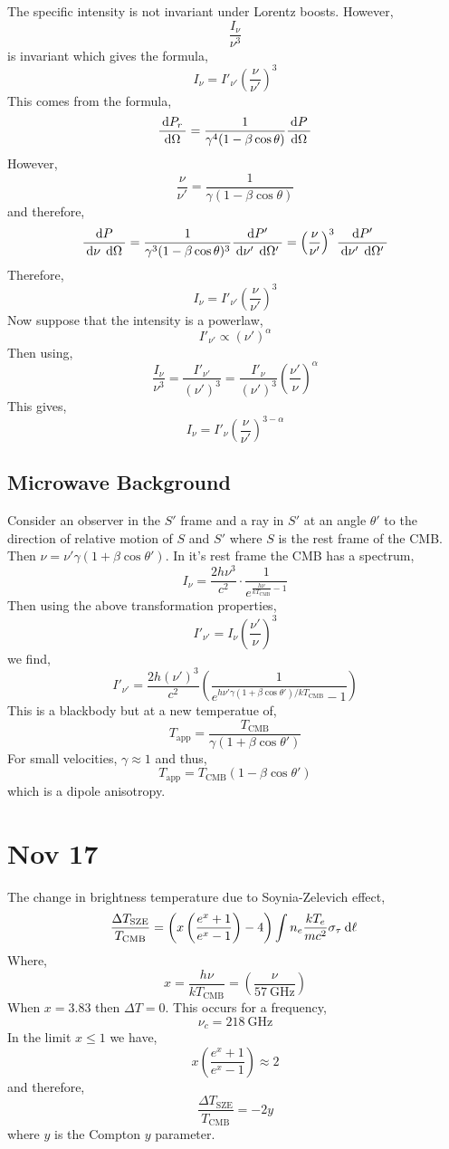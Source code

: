 \documentclass[11pt, a4paper]{article}
\begin{document}
The specific intensity is not invariant under Lorentz boosts. However,
\[ \frac{I_\nu}{\nu^3} \]
is invariant which gives the formula,
\[ I_{\nu} = I'_{\nu'} \left( \frac{\nu}{\nu'} \right)^3 \]
This comes from the formula,
\[ \frac{\: \mathrm{d}P_r \:}{\: \mathrm{d}\Omega \:} = \frac{1}{\gamma^4 (1 - \beta \cos{\theta})} \frac{\: \mathrm{d}P \:}{\: \mathrm{d}\Omega \:} \] 
However,
\[ \frac{\nu}{\nu'} = \frac{1}{\gamma ( 1 - \beta \cos{\theta})} \]
and therefore,
\[ \frac{\: \mathrm{d}P \:}{\: \mathrm{d}\nu \: \: \mathrm{d}\Omega \:} = \frac{1}{\gamma^3  (1 - \beta \cos{\theta})^3 } \frac{\: \mathrm{d}P' \:}{\: \mathrm{d}\nu' \: \: \mathrm{d}\Omega' \:} = \left( \frac{\nu}{\nu'} \right)^3 \frac{\: \mathrm{d}P' \:}{\: \mathrm{d}\nu' \: \: \mathrm{d}\Omega' \:}  \]
Therefore,
\[ I_{\nu} = I'_{\nu'} \left( \frac{\nu}{\nu'} \right)^3 \]
Now suppose that the intensity is a powerlaw,
\[ I'_{\nu'} \propto (\nu')^{\alpha} \]
Then using,
\[ \frac{I_\nu}{\nu^3} = \frac{I'_{\nu'}}{(\nu')^3} = \frac{I'_{\nu}}{(\nu')^3} \left( \frac{\nu'}{\nu} \right)^\alpha \]
This gives,
\[ I_\nu = I'_\nu \left( \frac{\nu}{\nu'} \right)^{3 - \alpha} \]

\subsection{Microwave Background}

Consider an observer in the $S'$ frame and a ray in $S'$ at an angle $\theta'$ to the direction of relative motion of $S$ and $S'$ where $S$ is the rest frame of the CMB. Then $\nu = \nu' \gamma(1 + \beta \cos{\theta'})$. In it's rest frame the CMB has a spectrum,
\[ I_\nu = \frac{2 h \nu^3}{c^2} \cdot \frac{1}{e^{\frac{h \nu}{k T_{\text{CMB}}} - 1}} \]
Then using the above transformation properties,
\[ I'_{\nu'} = I_\nu \left( \frac{\nu'}{\nu} \right)^3 \]
we find,
\[ I'_{\nu'} = \frac{2 h (\nu')^3}{c^2} \left( \frac{1}{e^{h \nu' \gamma (1 + \beta \cos{\theta'}) / k T_{\text{CMB}}} - 1} \right) \]
This is a blackbody but at a new temperatue of,
\[ T_{\text{app}} = \frac{T_{\text{CMB}}}{\gamma (1 + \beta \cos{\theta'})} \]
For small velocities, $\gamma \approx 1$ and thus,
\[ T_{\text{app}} = T_{\text{CMB}} (1 - \beta \cos{\theta'}) \]
which is a dipole anisotropy. 

\section{Nov 17}

The change in brightness temperature due to Soynia-Zelevich effect,
\[ \frac{\Delta T_{\text{SZE}}}{T_{\text{CMB}}} = \left( x \left( \frac{e^x + 1}{e^x - 1} \right) - 4 \right) \int n_e \frac{k T_e}{m c^2} \sigma_\tau \: \mathrm{d}\ell \: \]
Where,
\[ x = \frac{h \nu}{k T_{\text{CMB}}} = \left( \frac{\nu}{57 \: \mathrm{GHz}} \right) \]
When $x = 3.83$ then $\Delta T = 0$. This occurs for a frequency,
\[ \nu_c = 218 \: \mathrm{GHz} \]
In the limit $x \le 1$ we have,
\[ x \left( \frac{e^x + 1}{e^x - 1} \right) \approx 2 \]
and therefore,
\[  \frac{\Delta T_{\text{SZE}}}{T_{\text{CMB}}} = - 2 y \]
where $y$ is the Compton $y$ parameter. 
\end{document}
